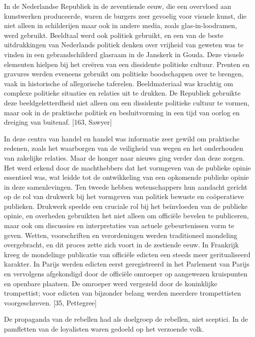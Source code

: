 \documentclass[11pt]{amsart}
\begin{document}
In de Nederlandse Republiek in de zeventiende eeuw, die een overvloed aan kunstwerken produceerde, waren de burgers
zeer gevoelig voor visuele kunst, die niet alleen in schilderijen maar ook in andere media, zoals glas-in-loodramen,
werd gebruikt. Beeldtaal werd ook politiek gebruikt, en een van de beste uitdrukkingen van Nederlands politiek denken
over vrijheid van geweten was te vinden in een gebrandschilderd glasraam in de Janskerk in Gouda. Deze visuele
elementen hielpen bij het creëren van een dissidente politieke cultuur. Prenten en gravures werden eveneens gebruikt om
politieke boodschappen over te brengen, vaak in historische of allegorische taferelen. Beeldmateriaal was krachtig om
complexe politieke situaties en relaties uit te drukken. De Republiek gebruikte deze beeldgeletterdheid niet alleen om
een dissidente politieke cultuur te vormen, maar ook in de praktische politiek en besluitvorming in een tijd van oorlog
en dreiging van buitenaf. [163, Sawyer]

In deze centra van handel en handel was informatie zeer gewild om praktische redenen, zoals het waarborgen van de
veiligheid van wegen en het onderhouden van zakelijke relaties. Maar de honger naar nieuws ging verder dan deze zorgen.
Het werd erkend door de machthebbers dat het vormgeven van de publieke opinie essentieel was, wat leidde tot de
ontwikkeling van een opkomende publieke opinie in deze samenlevingen. Ten tweede hebben wetenschappers hun aandacht
gericht op de rol van drukwerk bij het vormgeven van politiek bewuste en coöperatieve publieken. Drukwerk speelde een
cruciale rol bij het beïnvloeden van de publieke opinie, en overheden gebruikten het niet alleen om officiële bevelen
te publiceren, maar ook om discussies en interpretaties van actuele gebeurtenissen vorm te geven. Wetten, voorschriften
en verordeningen werden traditioneel mondeling overgebracht, en dit proces zette zich voort in de zestiende eeuw. In
Frankrijk kreeg de mondelinge publicatie van officiële edicten een steeds meer geritualiseerd karakter. In Parijs
werden edicten eerst geregistreerd in het Parlement van Parijs en vervolgens afgekondigd door de officiële omroeper op
aangewezen kruispunten en openbare plaatsen. De omroeper werd vergezeld door de koninklijke trompettist; voor edicten
van bijzonder belang werden meerdere trompettisten voorgeschreven. [35, Pettegree]

De propaganda van de rebellen had als doelgroep de rebellen, niet sceptici. In de pamfletten van de loyalisten waren
gedoeld op het verzoende volk.
\end{document}
